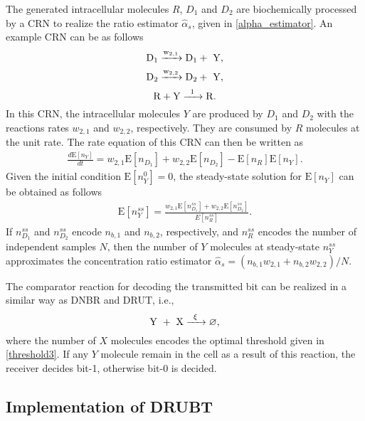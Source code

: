 \documentclass[twocolumn]{IEEEtran}
\newcommand{\E}{\mathrm{E}}
\begin{document}
The generated intracellular molecules $R$, $D_1$ and $D_2$ are biochemically processed by a CRN to realize the ratio estimator $\hat{\alpha}_s$, given in \eqref{alpha_estimator}. An example CRN can be as follows
\begin{equation}
\ce{ {D_1} ->[{w_{2,1}}] {D_1} + { Y} },
\end{equation}
\begin{equation}
\ce{ {D_2} ->[{w_{2,2}}] {D_2} + { Y} },
\end{equation}
\begin{equation}
\ce{ R + Y ->[{1}] R }.
\end{equation}
In this CRN, the intracellular molecules $Y$ are produced by $D_1$ and $D_2$ with the reactions rates $w_{2,1}$ and $w_{2,2}$, respectively. They are consumed by $R$ molecules at the unit rate. The rate equation of this CRN can then be written as 
\begin{align}
\frac{d\E[ n_{Y}] }{dt} = w_{2,1} \E[n_{D_1}] + w_{2,2} \E[n_{D_2}] -  \E[n_{R}]  \E[ n_{Y}].
\end{align}
Given the initial condition $\E[ n_{Y}^0] = 0$, the steady-state solution for $\E[ n_{Y}]$ can be obtained as follows
\begin{align}
\E[ n_{Y}^{ss}] = \frac{w_{2,1} \E[n_{D_1}^{ss}] + w_{2,2} \E[n_{D_2}^{ss}] }{E[n_{R}^{ss}]}. 
\end{align}
If $n_{D_1}^{ss}$ and $n_{D_2}^{ss}$ encode $n_{b,1}$ and $n_{b,2}$, respectively, and $n_{R}^{ss}$ encodes the number of independent samples $N$, then the number of $Y$ molecules at steady-state $n_{Y}^{ss}$ approximates the concentration ratio estimator $\hat{\alpha}_s = \left( n_{b,1} w_{2,1} + n_{b,2} w_{2,2} \right)/N.$

The comparator reaction for decoding the transmitted bit can be realized in a similar way as DNBR and DRUT, i.e., 
\begin{equation}
\ce{ {Y + X} ->[{\xi}] {\varnothing} },
\end{equation}
where the number of $X$ molecules encodes the optimal threshold given in \eqref{threshold3}. If any $Y$ molecule remain in the cell as a result of this reaction, the receiver decides bit-1, otherwise bit-0 is decided. 

%
%
%


\subsection{Implementation of DRUBT}
\end{document}
